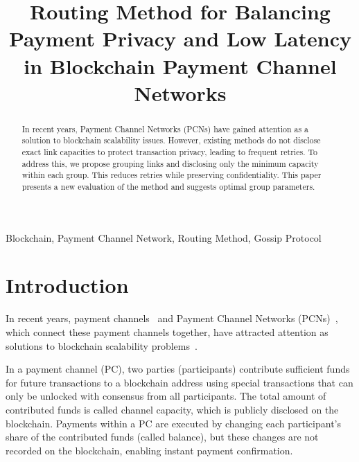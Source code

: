 \documentclass[conference]{IEEEtran}
\begin{document}
\title{Routing Method for Balancing Payment Privacy and Low Latency in Blockchain Payment Channel Networks}

\author{
	\and
}

\maketitle

\begin{abstract}
	In recent years, Payment Channel Networks (PCNs) have gained attention as a solution to blockchain scalability issues. However, existing methods do not disclose exact link capacities to protect transaction privacy, leading to frequent retries. To address this, we propose grouping links and disclosing only the minimum capacity within each group. This reduces retries while preserving confidentiality. This paper presents a new evaluation of the method and suggests optimal group parameters.
\end{abstract}

\begin{IEEEkeywords}
	Blockchain, Payment Channel Network, Routing Method, Gossip Protocol
\end{IEEEkeywords}

\section{Introduction}

In recent years, payment channels~\cite{poon_dryja_2016} and Payment Channel Networks (PCNs)~\cite{poon_dryja_2016}, which connect these payment channels together, have attracted attention as solutions to blockchain scalability problems~\cite{nakamoto2008bitcoin}.

In a payment channel (PC), two parties (participants) contribute sufficient funds for future transactions to a blockchain address using special transactions that can only be unlocked with consensus from all participants. The total amount of contributed funds is called channel capacity, which is publicly disclosed on the blockchain. Payments within a PC are executed by changing each participant's share of the contributed funds (called balance), but these changes are not recorded on the blockchain, enabling instant payment confirmation.
\end{document}
